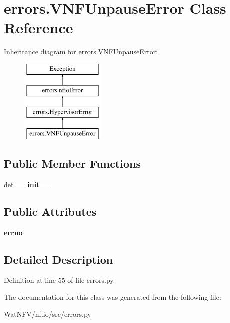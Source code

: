 \hypertarget{classerrors_1_1VNFUnpauseError}{\section{errors.\-V\-N\-F\-Unpause\-Error Class Reference}
\label{classerrors_1_1VNFUnpauseError}
}
Inheritance diagram for errors.\-V\-N\-F\-Unpause\-Error\-:\begin{figure}[H]
\begin{center}
\leavevmode
\includegraphics[height=4.000000cm]{classerrors_1_1VNFUnpauseError}
\end{center}
\end{figure}
\subsection*{Public Member Functions}
\begin{DoxyCompactItemize}
\item 
\hypertarget{classerrors_1_1VNFUnpauseError_a85aae2b447871d3ca8a4c9253b0f378b}{def {\bfseries \-\_\-\-\_\-init\-\_\-\-\_\-}}\label{classerrors_1_1VNFUnpauseError_a85aae2b447871d3ca8a4c9253b0f378b}

\end{DoxyCompactItemize}
\subsection*{Public Attributes}
\begin{DoxyCompactItemize}
\item 
\hypertarget{classerrors_1_1VNFUnpauseError_a80bf041b87465d52bde24a08444c0b6b}{{\bfseries errno}}\label{classerrors_1_1VNFUnpauseError_a80bf041b87465d52bde24a08444c0b6b}

\end{DoxyCompactItemize}


\subsection{Detailed Description}


Definition at line 55 of file errors.\-py.



The documentation for this class was generated from the following file\-:\begin{DoxyCompactItemize}
\item 
Wat\-N\-F\-V/nf.\-io/src/errors.\-py\end{DoxyCompactItemize}
